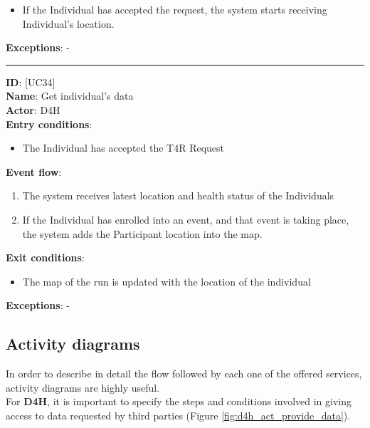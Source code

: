 \documentclass[a4paper, hidelinks, 12pt]{report}
\newcommand\usecase[1]{ [UC#1] }
\begin{document}
\begin{itemize}
\begin{itemize}
			\item{If the Individual has accepted the request, the system starts receiving Individual's location.}
		\end{itemize}
		\textbf{Exceptions}: - \\
		\rule{\linewidth}{0.4pt}
		\textbf{ID}: \usecase{34} \\
		\textbf{Name}: Get individual's data \\
		\textbf{Actor}: D4H \\
		\textbf{Entry conditions}:
		\begin{itemize}
			\item{The Individual has accepted the T4R Request}
		\end{itemize}
		\textbf{Event flow}:
		\begin{enumerate}
			\item{The system receives latest location and health status of the Individuals}
			\item{If the Individual has enrolled into an event, and that event is taking place, the system adds the Participant location into the map.}
		\end{enumerate}
		\textbf{Exit conditions}: 
		\begin{itemize}
			\item{The map of the run is updated with the location of the individual}
		\end{itemize}
		\textbf{Exceptions}: -
	\end{itemize}
	
	\subsection{Activity diagrams}
	In order to describe in detail the flow followed by each one of the offered services, activity diagrams are highly useful. \\
	
	 For \textbf{D4H}, it is important to specify the steps and conditions involved in giving access to data requested by third parties (Figure \ref{fig:d4h_act_provide_data}).\\
	
\end{document}
